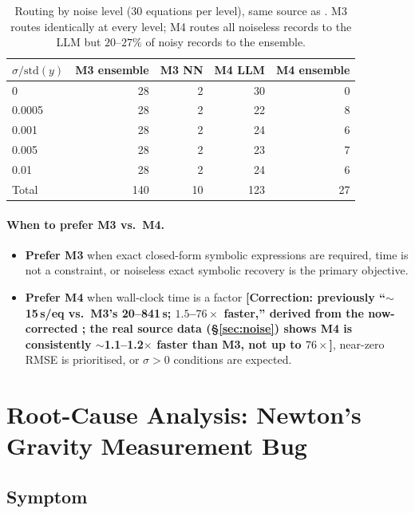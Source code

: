 \documentclass[twoside,11pt]{article}
\begin{document}
\begin{table}[H]
\centering
\caption{Routing by noise level (30 equations per level), same source as
         . M3 routes identically at every level; M4 routes all
         noiseless records to the LLM but $20$--$27\%$ of noisy records to the
         ensemble.}
\label{tab:arch_by_noise}
\small
\begin{tabular}{l r r r r}
\toprule
$\sigma/\mathrm{std}(y)$ & M3 ensemble & M3 NN & M4 LLM & M4 ensemble\\
\midrule
0      & 28 & 2 & 30 & 0\\
0.0005 & 28 & 2 & 22 & 8\\
0.001  & 28 & 2 & 24 & 6\\
0.005  & 28 & 2 & 23 & 7\\
0.01   & 28 & 2 & 24 & 6\\
\midrule
Total  & 140 & 10 & 123 & 27\\
\bottomrule
\end{tabular}
\end{table}

\paragraph{When to prefer M3 vs.\ M4.}
\begin{itemize}
\item \textbf{Prefer M3} when exact closed-form symbolic expressions are
  required, time is not a constraint, or noiseless exact symbolic recovery
  is the primary objective.
\item \textbf{Prefer M4} when wall-clock time is a factor
  \textbf{[Correction: previously ``$\sim$15\,s/eq vs.\ M3's 20--841\,s;
  $1.5$--$76\times$ faster,'' derived from the now-corrected
  ; the real source data (\S\ref{sec:noise}) shows M4
  is consistently $\sim$1.1--1.2$\times$ faster than M3, not up to
  $76\times$]}, near-zero RMSE is prioritised, or $\sigma>0$ conditions are
  expected.
\end{itemize}

\section{Root-Cause Analysis: Newton's Gravity Measurement Bug}
\label{sec:bugfix}

\subsection{Symptom}
\end{document}
